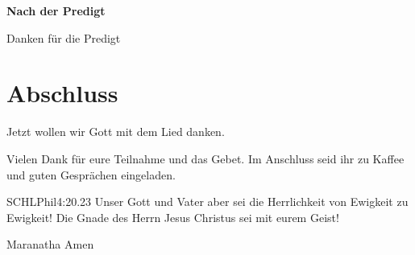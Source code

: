 \documentclass{../inc/mybib}
\begin{document}
\textbf{Nach der Predigt}

Danken für die Predigt

\section{Abschluss}

Jetzt wollen wir Gott mit dem Lied  danken.


Vielen Dank für eure Teilnahme und das Gebet. Im Anschluss seid ihr zu Kaffee und guten Gesprächen eingeladen.
\beten{}

\begin{bibelbox}{SCHL}{Phil}{4:20.23}
Unser Gott und Vater aber sei die Herrlichkeit von Ewigkeit zu Ewigkeit!
Die Gnade des Herrn Jesus Christus sei mit eurem Geist!
\end{bibelbox}

Maranatha Amen
\end{document}
